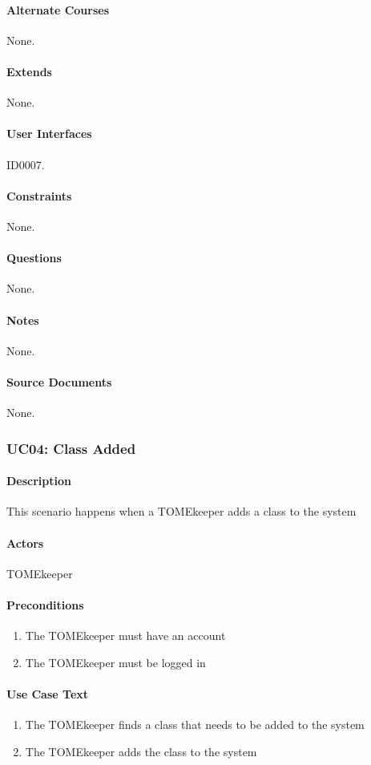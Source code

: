 \documentclass[12pt,titlepage]{article}
\begin{document}
\paragraph{Alternate Courses}
None.
\paragraph{Extends}
None.
\paragraph{User Interfaces}
ID0007.
\paragraph{Constraints}
None.
\paragraph{Questions}
None.
\paragraph{Notes}
None.
\paragraph{Source Documents}
None.

\subsubsection{UC04: Class Added}
\paragraph{Description}
This scenario happens when a TOMEkeeper adds a class to the system
\paragraph{Actors}
TOMEkeeper
\paragraph{Preconditions}
\begin{enumerate}
	\item The TOMEkeeper must have an account
	\item The TOMEkeeper must be logged in
\end{enumerate}
\paragraph{Use Case Text}
\begin{enumerate}
	\item The TOMEkeeper finds a class that needs to be added to the system
	\item The TOMEkeeper adds the class to the system
\end{enumerate}
\end{document}
